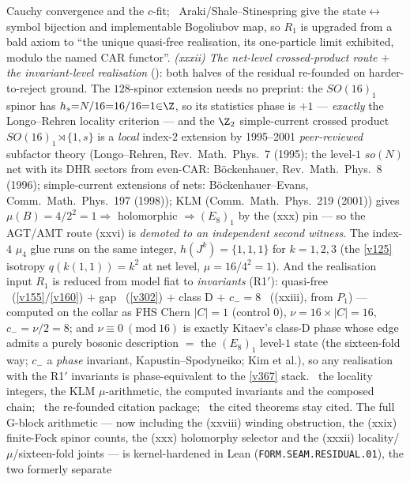 Cauchy convergence and the $c$-fit; \mC\ Araki/Shale--Stinespring give the state$\leftrightarrow$symbol bijection and
implementable Bogoliubov map, so $R_1$ is upgraded from a bald axiom to ``the unique quasi-free realisation, its
one-particle limit exhibited, modulo the named CAR functor''. \emph{(xxxii) The net-level crossed-product route
$+$ the invariant-level realisation} (): both halves of the residual
re-founded on harder-to-reject ground. The $128$-spinor extension needs no preprint: the $SO(16)_1$ spinor has
$h_s{=}N/16{=}16/16{=}1{\in}\Z$, so its statistics phase is $+1$ --- \emph{exactly} the Longo--Rehren locality
criterion --- and the $\Z_2$ simple-current crossed product $SO(16)_1{\rtimes}\{1,s\}$ is a \emph{local} index-$2$
extension by 1995--2001 \emph{peer-reviewed} subfactor theory (Longo--Rehren, Rev.\ Math.\ Phys.\ 7 (1995); the
level-$1$ $so(N)$ net with its DHR sectors from even-CAR: B\"ockenhauer, Rev.\ Math.\ Phys.\ 8 (1996);
simple-current extensions of nets: B\"ockenhauer--Evans, Comm.\ Math.\ Phys.\ 197 (1998)); KLM (Comm.\ Math.\
Phys.\ 219 (2001)) gives $\mu(B){=}4/2^2{=}1\Rightarrow$ holomorphic $\Rightarrow(E_8)_1$ by the (xxx) pin ---
so the AGT/AMT route (xxvi) is \emph{demoted to an independent second witness}. The index-$4$ $\mu_4$ glue runs on
the same integer, $h(J^k){=}\{1,1,1\}$ for $k{=}1,2,3$ (the \vref{v125} isotropy $q(k(1,1)){=}k^2$ at net level,
$\mu{=}16/4^2{=}1$). And the realisation input $R_1$ is reduced from model fiat to \emph{invariants}
(R1$'$): quasi-free \mC\ (\vref{v155}/\vref{v160}) $+$ gap \mE\ (\vref{v302}) $+$ class D $+$ $c_-{=}8$ \mE\
((xxiii), from $P_1$) --- computed on the collar as FHS Chern $|C|{=}1$ (control $0$), $\nu{=}16{\times}|C|{=}16$,
$c_-{=}\nu/2{=}8$; and $\nu{\equiv}0\ (\mathrm{mod}\ 16)$ is exactly Kitaev's class-D phase whose edge admits a
purely bosonic description $=$ the $(E_8)_1$ level-$1$ state (the sixteen-fold way; $c_-$ a \emph{phase} invariant,
Kapustin--Spodyneiko; Kim et al.), so any realisation with the R1$'$ invariants is phase-equivalent to the
\vref{v367} stack. \mE\ the locality integers, the KLM $\mu$-arithmetic, the computed invariants and the composed
chain; \mC\ the re-founded citation package; \mO\ the cited theorems stay cited. The full G-block
arithmetic --- now including the (xxviii) winding obstruction, the (xxix) finite-Fock spinor counts, the (xxx)
holomorphy selector and the (xxxii) locality/$\mu$/sixteen-fold joints --- is kernel-hardened in Lean
(\texttt{FORM.SEAM.RESIDUAL.01}), the two formerly separate

